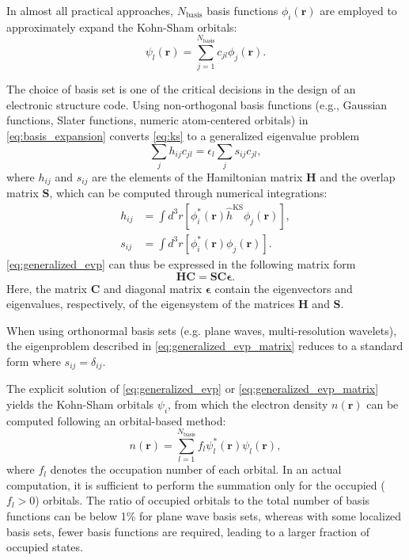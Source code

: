 \documentclass{report}
\begin{document}
In almost all practical approaches, $N_\text{basis}$ basis functions ${\phi_i(\boldsymbol{r})}$ are employed to approximately expand the Kohn-Sham orbitals:
\begin{equation}
\label{eq:basis_expansion}
\psi_l(\boldsymbol{r}) = \sum_{j=1}^{N_\text{basis}} c_{jl} \phi_j(\boldsymbol{r}) .
\end{equation}

The choice of basis set is one of the critical decisions in the design of an electronic structure code.  Using non-orthogonal basis functions (e.g., Gaussian functions, Slater functions, numeric atom-centered orbitals) in \ref{eq:basis_expansion} converts \ref{eq:ks} to a generalized eigenvalue problem
\begin{equation}
\label{eq:generalized_evp}
\sum_j h_{ij} c_{jl} = \epsilon_l \sum_j s_{ij} c_{jl} ,
\end{equation}
where $h_{ij}$ and $s_{ij}$ are the elements of the Hamiltonian matrix $\boldsymbol{H}$ and the overlap matrix $\boldsymbol{S}$, which can be computed through numerical integrations:
\begin{equation}
\label{eq:ham_ovlp_integration}
\begin{split}
h_{ij} & = \int d^3 r [\phi_i^*(\boldsymbol{r}) \hat{h}^\text{KS} \phi_j(\boldsymbol{r})] ,\\
s_{ij} & = \int d^3 r [\phi_i^*(\boldsymbol{r}) \phi_j(\boldsymbol{r})] .
\end{split}
\end{equation}
\ref{eq:generalized_evp} can thus be expressed in the following matrix form
\begin{equation}
\label{eq:generalized_evp_matrix}
\boldsymbol{H} \boldsymbol{C} = \boldsymbol{S} \boldsymbol{C} \boldsymbol{\epsilon} .
\end{equation}
Here, the matrix $\boldsymbol{C}$ and diagonal matrix $\boldsymbol{\epsilon}$ contain the eigenvectors and eigenvalues, respectively, of the eigensystem of the matrices $\boldsymbol{H}$ and $\boldsymbol{S}$.

When using orthonormal basis sets (e.g. plane waves, multi-resolution wavelets), the eigenproblem described in \ref{eq:generalized_evp_matrix} reduces to a standard form where $s_{ij}=\delta_{ij}$.

The explicit solution of \ref{eq:generalized_evp} or \ref{eq:generalized_evp_matrix} yields the Kohn-Sham orbitals $\psi_i$, from which the electron density $n(\boldsymbol{r})$ can be computed following an orbital-based method:
\begin{equation}
\label{eq:orbital_update}
n(\boldsymbol{r}) = \sum_{l=1}^{N_\text{basis}} f_l \psi_l^*(\boldsymbol{r}) \psi_l(\boldsymbol{r}) ,
\end{equation}
where $f_l$ denotes the occupation number of each orbital.  In an actual computation, it is sufficient to perform the summation only for the occupied ($f_l > 0$) orbitals.  The ratio of occupied orbitals to the total number of basis functions can be below 1\% for plane wave basis sets, whereas with some localized basis sets, fewer basis functions are required, leading to a larger fraction of occupied states.
\end{document}
